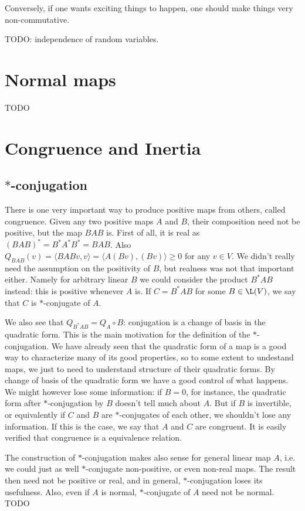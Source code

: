 Conversely, if one wants exciting things to happen, one should make things very non-commutative.

TODO: independence of random variables.

\section{Normal maps}

TODO

\section{Congruence and Inertia}

\subsection{$*$-conjugation}

There is one very important way to produce positive maps from others, called congruence. Given any two positive maps $A$ and $B$, their composition need not be positive, but the map $BAB$ is. First of all, it is real as $(BAB)^{*} = B^{*} A^{*} B^{*} = BAB$. Also $Q_{BAB}(v) = \langle BAB v, v \rangle = \langle A (B v), (B v) \rangle \geq 0$ for any $v \in V$. We didn't really need the assumption on the positivity of $B$, but realness was not that important either. Namely for arbitrary linear $B$ we could consider the product $B^{*}AB$ instead: this is positive whenever $A$ is. If $C = B^{*}AB$ for some $B \in \L(V)$, we say that $C$ is $*$-conjugate of $A$.

We also see that $Q_{B^{*}AB} = Q_{A} \circ B$: conjugation is a change of basis in the quadratic form. This is the main motivation for the definition of the $*$-conjugation. We have already seen that the quadratic form of a map is a good way to characterize many of its good properties, so to some extent to undestand maps, we just to need to understand structure of their quadratic forms. By change of basis of the quadratic form we have a good control of what happens. We might however lose some information: if $B = 0$, for instance, the quadratic form after $*$-conjugation by $B$ doesn't tell much about $A$. But if $B$ is invertible, or equivalently if $C$ and $B$ are $*$-conjugates of each other, we shouldn't lose any information. If this is the case, we say that $A$ and $C$ are congruent. It is easily verified that congruence is a equivalence relation.

The construction of $*$-conjugation makes also sense for general linear map $A$, i.e. we could just as well $*$-conjugate non-positive, or even non-real maps. The result then need not be positive or real, and in general, $*$-conjugation loses its usefulness. Also, even if $A$ is normal, $*$-conjugate of $A$ need not be normal. TODO

